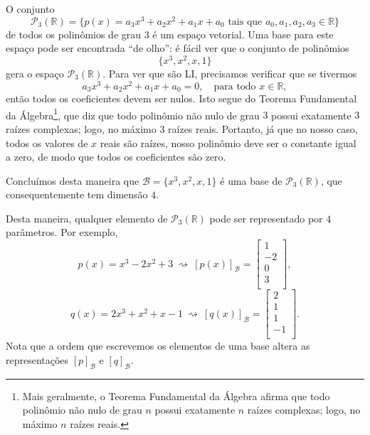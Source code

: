 \begin{ex}
	O conjunto
	\begin{equation}
	\mathcal{P}_3 (\mathbb{R}) = \big\{ p(x) = a_3 x^3 + a_2 x^2 + a_1 x + a_0 \text{ tais que } a_0, a_1, a_2, a_3 \in \mathbb{R} \big\}
	\end{equation} de todos os polinômios de grau 3 é um espaço vetorial. Uma base para este espaço pode ser encontrada ``de olho'': é fácil ver que o conjunto de polinômios
	\begin{equation}
	\big\{ x^3, x^2, x, 1 \big\}
	\end{equation} gera o espaço $\mathcal{P}_3 (\mathbb{R})$. Para ver que são LI, precisamos verificar que se tivermos
	\begin{equation}
	a_3 x^3 + a_2 x^2 + a_1 x + a_0 = 0, \quad \text{para todo } x \in \mathbb{R},
	\end{equation} então todos os coeficientes devem ser nulos. Isto segue do Teorema Fundamental da Álgebra\footnote{Mais geralmente, o Teorema Fundamental da Álgebra afirma que todo polinômio não nulo de grau $n$ possui exatamente $n$ raízes complexas; logo, no máximo $n$ raízes reais.}, que diz que todo polinômio não nulo de grau $3$ possui exatamente $3$ raízes complexas; logo, no máximo $3$ raízes reais. Portanto, já que no nosso caso, todos os valores de $x$ reais são raízes, nosso polinômio deve ser o constante igual a zero, de modo que todos os coeficientes são zero.

	Concluímos desta maneira que $\mathcal{B} = \big\{ x^3, x^2, x, 1 \big\}$ é uma base de $\mathcal{P}_3 (\mathbb{R})$, que consequentemente tem dimensão $4.$

	Desta maneira, qualquer elemento de $\mathcal{P}_3 (\mathbb{R})$ pode ser representado por $4$ parâmetros. Por exemplo,
	\begin{equation}
	p(x) = x^3 - 2 x^2 + 3 \ \rightsquigarrow \ [p(x)]_{\mathcal{B}} = \left[
	\begin{array}{c}
	1 \\
	-2 \\
	0 \\
	3 \\
	\end{array}
	\right],
	\end{equation}
	\begin{equation}
	q(x) = 2 x^3 + x^2 + x -1 \ \rightsquigarrow \ [q(x)]_{\mathcal{B}} = \left[
	\begin{array}{c}
	2 \\
	1 \\
	1 \\
	-1 \\
	\end{array}
	\right].
	\end{equation} Nota que a ordem que escrevemos os elementos de uma base altera as representações $[p]_{\mathcal{B}}$ e $[q]_{\mathcal{B}}$.
\end{ex}


